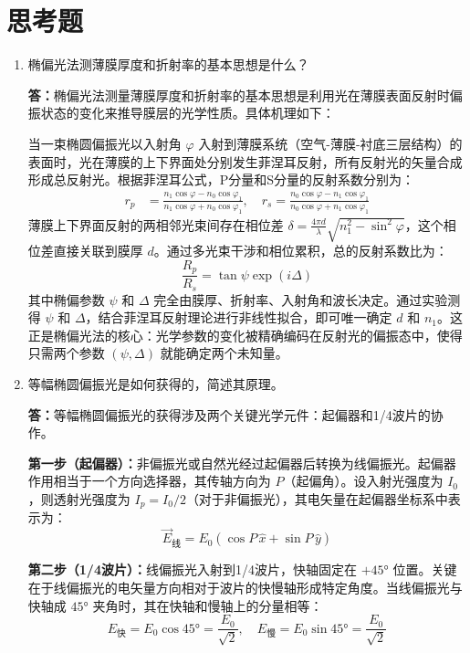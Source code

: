 \documentclass[11pt]{article}
\begin{document}
\section{思考题}
\begin{enumerate}
    \item 椭偏光法测薄膜厚度和折射率的基本思想是什么？
    
    \textbf{答：}椭偏光法测量薄膜厚度和折射率的基本思想是利用光在薄膜表面反射时偏振状态的变化来推导膜层的光学性质。具体机理如下：
    
    当一束椭圆偏振光以入射角 $\varphi$ 入射到薄膜系统（空气-薄膜-衬底三层结构）的表面时，光在薄膜的上下界面处分别发生菲涅耳反射，所有反射光的矢量合成形成总反射光。根据菲涅耳公式，P分量和S分量的反射系数分别为：
    \begin{align}
        r_p &= \frac{n_1 \cos\varphi - n_0 \cos\varphi_1}{n_1 \cos\varphi + n_0 \cos\varphi_1}, \quad
        r_s = \frac{n_0 \cos\varphi - n_1 \cos\varphi_1}{n_0 \cos\varphi + n_1 \cos\varphi_1}
    \end{align}
    薄膜上下界面反射的两相邻光束间存在相位差 $\delta = \frac{4\pi d}{\lambda}\sqrt{n_1^2 - \sin^2\varphi}$，这个相位差直接关联到膜厚 $d$。通过多光束干涉和相位累积，总的反射系数比为：
    \begin{equation}
        \frac{R_p}{R_s} = \tan\psi \exp(i\Delta)
    \end{equation}
    其中椭偏参数 $\psi$ 和 $\Delta$ 完全由膜厚、折射率、入射角和波长决定。通过实验测得 $\psi$ 和 $\Delta$，结合菲涅耳反射理论进行非线性拟合，即可唯一确定 $d$ 和 $n_1$。这正是椭偏光法的核心：光学参数的变化被精确编码在反射光的偏振态中，使得只需两个参数 $(\psi, \Delta)$ 就能确定两个未知量。
    
    \item 等幅椭圆偏振光是如何获得的，简述其原理。
    
    \textbf{答：}等幅椭圆偏振光的获得涉及两个关键光学元件：起偏器和1/4波片的协作。
    
    \textbf{第一步（起偏器）：}非偏振光或自然光经过起偏器后转换为线偏振光。起偏器作用相当于一个方向选择器，其传轴方向为 $P$（起偏角）。设入射光强度为 $I_0$，则透射光强度为 $I_p = I_0/2$（对于非偏振光），其电矢量在起偏器坐标系中表示为：
    \begin{equation}
        \vec{E}_{线} = E_0(\cos P \, \hat{x} + \sin P \, \hat{y})
    \end{equation}
    
    \textbf{第二步（1/4波片）：}线偏振光入射到1/4波片，快轴固定在 $+45°$ 位置。关键在于线偏振光的电矢量方向相对于波片的快慢轴形成特定角度。当线偏振光与快轴成 $45°$ 夹角时，其在快轴和慢轴上的分量相等：
    \begin{equation}
        E_{快} = E_0 \cos 45° = \frac{E_0}{\sqrt{2}}, \quad E_{慢} = E_0 \sin 45° = \frac{E_0}{\sqrt{2}}
    \end{equation}
    

\end{enumerate}
\end{document}
